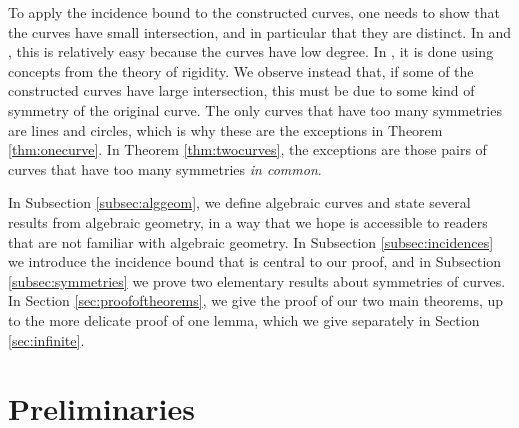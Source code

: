 \documentclass[12pt]{article}
\begin{document}
To apply the incidence bound to the constructed curves,
one needs to show that the curves have small intersection, and in particular that they are distinct.
In \cite{elekes:note} and \cite{sharir:distances}, this is relatively easy because the curves have low degree.
In \cite{charalambides:gaps}, it is done using concepts from the theory of rigidity.
We observe instead that, if some of the constructed curves have large intersection,
this must be due to some kind of symmetry of the original curve.
The only curves that have too many symmetries are lines and circles,
which is why these are the exceptions in Theorem \ref{thm:onecurve}.
In Theorem \ref{thm:twocurves}, 
the exceptions are those pairs of curves that have too many symmetries \textit{in common}.


\vspace{10pt}

In Subsection \ref{subsec:alggeom}, we define algebraic curves and state several results from algebraic geometry,
in a way that we hope is accessible to readers that are not familiar with algebraic geometry.
In Subsection \ref{subsec:incidences} we introduce the incidence bound that is central to our proof,
and in Subsection \ref{subsec:symmetries} we prove two elementary results about symmetries of curves.
 In Section \ref{sec:proofoftheorems}, we give the proof of our two main theorems,
 up to the more delicate proof of one lemma, 
 which we give separately in Section \ref{sec:infinite}.


\section{Preliminaries}
\end{document}
